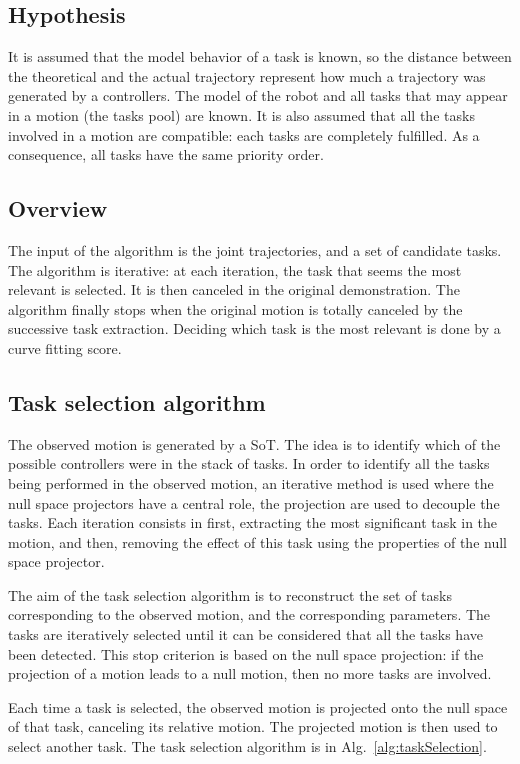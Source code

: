 \documentclass[letterpaper, 10pt, conference]{ieeeconf}      %
\begin{document}
\subsection{Hypothesis}
It is assumed that the model behavior of a task is known, so the distance between
the theoretical and the actual trajectory represent how much a trajectory
was generated by a controllers.
The model of the robot and all tasks that may appear in a motion (the tasks pool) are known.
It is also assumed that all the tasks involved in a motion are compatible:
each tasks are completely fulfilled. As a consequence, all
tasks have the same priority order. 

\subsection{Overview}
The input of the algorithm is the joint trajectories, and a set of candidate
tasks. The algorithm is iterative: at each iteration, the task that seems the
most relevant is selected. It is then canceled in the original demonstration.
The algorithm finally stops when the original
motion is totally canceled by the successive task extraction. Deciding which
task is the most relevant is done by a curve fitting score. 

\subsection{Task selection algorithm} \label{sec:alg1:selec}
The observed motion is generated by a SoT.  The idea is to identify which of the possible controllers were in the stack of tasks. 
In order to identify all the
tasks being performed in the observed motion, an iterative method is used where
the null space projectors have a central role, the projection
are used to decouple the tasks.
Each iteration consists in first, extracting the most significant task in the motion,
and then, removing the effect of this task using the properties of the null space projector.

The aim of the task selection algorithm is to reconstruct the set of tasks corresponding
to the observed motion, and the corresponding parameters.
The tasks are iteratively selected until it can be considered that all the tasks
have been detected.
This stop criterion is based on the
null space projection: if the projection of a motion
leads to a null motion, then no more tasks are involved.

Each time a task is selected, the observed motion is projected
onto the null space of that task, canceling its relative motion. 
The projected motion is then used to select another task.
The task selection algorithm is in Alg.~\ref{alg:taskSelection}.
\end{document}
